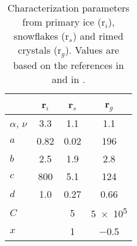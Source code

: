 \begin{table}[h]
	\begin{center}
		\caption{Characterization parameters from primary ice (r$_i$), snowflakes (r$_s$) and rimed crystals (r$_g$). Values are based on the references in \cite{meteo_france_meso-nh_2009} and in \cite{pinty_mixed-phased_1998}. }\label{tab:ice_parameter}
		\begin{tabular}{l|c|c|c}
			\hline \hline
            				& \textbf{r$_i$}& \textbf{r$_s$}& \textbf{r$_g$} \\ \hline\hline
            $\alpha$, $\nu$ & \num{3.3}		& \num{1.1}			& \num{1.1} \\ \hline
            $a$				& \num{0.82}	& \num{0.02}		& \num{196} \\ 
            $b$				& \num{2.5}		& \num{1.9}			& \num{2.8} \\ \hline
            $c$				& \num{800}		& \num{5.1}			& \num{124} \\ 
            $d$				& \num{1.0}		& \num{0.27}		& \num{0.66} \\ \hline
            $C$				&				& \num{5}			& \num{5e5} \\
            $x$				&				& \num{1}			& \num{-0.5} \\
			\hline \hline
		\end{tabular}
	\end{center}
\end{table}